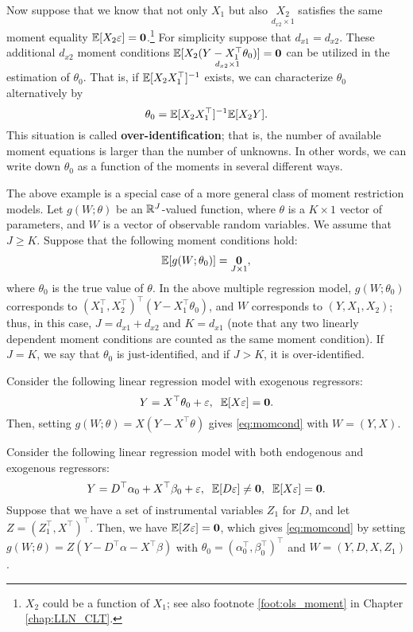 \documentclass[11pt, A4paper, openany, uplatex]{book}
\begin{document}
Now suppose that we know that not only $X_1$ but also $\underset{d_{x2} \times 1}{X_2}$ satisfies the same moment equality $\mathbb{E} [X_2 \varepsilon] = \mathbf{0}$.\footnote{$X_2$ could be a function of $X_1$; see also footnote \ref{foot:ols_moment} in Chapter \ref{chap:LLN_CLT}.}
For simplicity suppose that $d_{x1} = d_{x2}$.
These additional $d_{x2}$ moment conditions $\underset{d_{x2} \times 1}{\mathbb{E}[X_2 (Y - X_1^\top \theta_0)] = \mathbf{0}}$ can be utilized in the estimation of $\theta_0$.
That is, if $\mathbb{E} [X_2X_1^\top]^{-1}$ exists, we can characterize $\theta_0$ alternatively by
\[
	\theta_0 = \mathbb{E}[X_2 X_1^\top]^{-1} \mathbb{E}[X_2 Y].
\]
This situation is called \textbf{over-identification}; that is, the number of available moment equations is larger than the number of unknowns.
In other words, we can write down $\theta_0$ as a function of the moments in several different ways. 
\bigskip

The above example is a special case of a more general class of moment restriction models.
Let $g(W; \theta)$ be an $\mathbb{R}^J$-valued function, where $\theta$ is a $K \times 1$ vector of parameters, and $W$ is a vector of observable random variables.
We assume that $J \geq K$.
Suppose that the following moment conditions hold:
\begin{align}\label{eq:momcond}
	\mathbb{E}[g(W; \theta_0)] = \underset{J \times 1}{\mathbf{0}},
\end{align}
where $\theta_0$ is the true value of $\theta$.
In the above multiple regression model, $g(W; \theta_0)$ corresponds to $(X_1^\top, X_2^\top)^\top (Y - X_1^\top\theta_0)$, and $W$ corresponds to $(Y, X_1, X_2)$; thus, in this case, $J = d_{x1} + d_{x2}$ and $K = d_{x1}$ (note that any two linearly dependent moment conditions are counted as the same moment condition).
If $J = K$, we say that $\theta_0$ is just-identified, and if $J > K$, it is over-identified.

\begin{example}\label{ex:ols}\upshape
	Consider the following linear regression model with exogenous regressors:
	\[
	Y = X^\top\theta_0 + \varepsilon, \;\; \mathbb{E}[X \varepsilon] = \mathbf{0}.
	\]
	Then, setting $g(W; \theta) = X( Y - X^\top\theta)$ gives \eqref{eq:momcond} with $W = (Y,X)$.
\end{example}

\begin{example}\label{ex:2sls}\upshape
	Consider the following linear regression model with both endogenous and exogenous regressors:
	\[
	Y = D^\top\alpha_0 + X^\top\beta_0 + \varepsilon, \;\; \mathbb{E}[D \varepsilon] \neq \mathbf{0}, \;\; \mathbb{E}[X \varepsilon] = \mathbf{0}.
	\]
	Suppose that we have a set of instrumental variables $Z_1$ for $D$, and let $Z = (Z_1^\top, X^\top)^\top$.
	Then, we have $\mathbb{E} [Z \varepsilon] = \mathbf{0}$, which gives \eqref{eq:momcond} by setting $g(W; \theta) = Z( Y - D^\top\alpha - X^\top\beta)$ with $\theta_0 = (\alpha_0^\top, \beta_0^\top)^\top$ and $W = (Y,D,X,Z_1)$.
\end{example}
\end{document}
